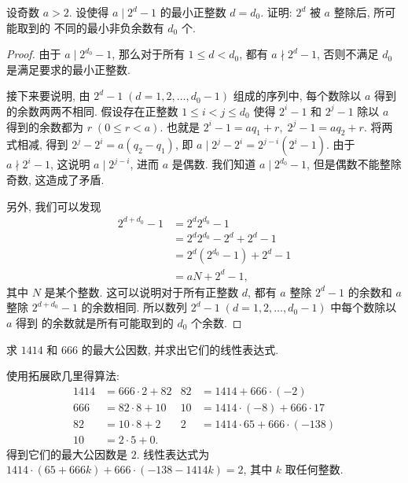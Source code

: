 \documentclass[a5paper,fleqn,10pt]{article}
\begin{document}
\begin{exmp}
    设奇数 $a>2$. 设使得 $a\mid 2^d-1$ 的最小正整数 $d=d_0$. 证明: $2^d$ 被 $a$ 整除后, 所可能取到的
    不同的最小非负余数有 $d_0$ 个.
    \begin{proof}
        由于 $a\mid 2^{d_0}-1$, 那么对于所有 $1\leq d<d_0$, 都有 $a\nmid 2^d-1$, 否则不满足 $d_0$
        是满足要求的最小正整数.
        
        接下来要说明, 由 $2^d-1\;(d=1,2,\ldots,d_0-1)$ 组成的序列中, 每个数除以
        $a$ 得到的余数两两不相同. 假设存在正整数 $1\leq i<j\leq d_0$ 使得 $2^i-1$ 和 $2^j-1$
        除以 $a$ 得到的余数都为 $r\;(0\leq r<a)$. 也就是 $2^i-1=aq_1+r,\;2^j-1=aq_2+r$.
        将两式相减, 得到 $2^j-2^i=a(q_2-q_1)$, 即 $a\mid 2^j-2^i=2^{j-i}(2^i-1)$. 由于
        $a\nmid 2^i-1$, 这说明 $a\mid 2^{j-i}$, 进而 $a$ 是偶数. 我们知道 $a\mid 2^{d_0}-1$,
        但是偶数不能整除奇数, 这造成了矛盾.

        另外, 我们可以发现
        \begin{align*}
            2^{d+d_0}-1&=2^d2^{d_0}-1\\
            &=2^d2^{d_0}-2^d+2^d-1\\
            &=2^d(2^{d_0}-1)+2^d-1\\
            &=aN+2^d-1,
        \end{align*}
        其中 $N$ 是某个整数. 这可以说明对于所有正整数 $d$, 都有 $a$ 整除 $2^d-1$ 的余数和 $a$ 整除
        $2^{d+d_0}-1$ 的余数相同. 所以数列 $2^d-1\;(d=1,2,\ldots,d_0-1)$ 中每个数除以 $a$ 得到
        的余数就是所有可能取到的 $d_0$ 个余数.
    \end{proof}
\end{exmp}

\begin{exmp}
    求 $1414$ 和 $666$ 的最大公因数, 并求出它们的线性表达式.
    \begin{solution}
        使用拓展欧几里得算法:
        \begin{align*}
            1414 & =666\cdot2+82 & 82 & =1414+666\cdot(-2)          \\
            666  & =82\cdot8+10  & 10 & =1414\cdot(-8)+666\cdot17   \\
            82   & =10\cdot8+2   & 2  & =1414\cdot65+666\cdot(-138) \\
            10   & =2\cdot5+0.
        \end{align*}
        得到它们的最大公因数是 $2$. 线性表达式为 $1414\cdot(65+666k)+666\cdot(-138-1414k)=2$, 其中 $k$ 取任何整数.
    \end{solution}
\end{exmp}
\end{document}
